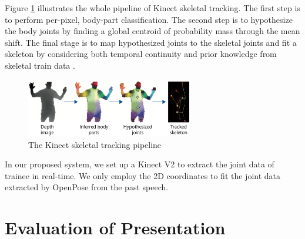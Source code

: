 
\par Figure \ref{fig:trackingpipeline} illustrates the whole pipeline of Kinect skeletal tracking. The first step is to perform per-pixel, body-part classification. The second step is to hypothesize the body joints by finding a global centroid of probability mass through the mean shift. The final stage is to map hypothesized joints to the skeletal joints and fit a skeleton by considering both temporal continuity and prior knowledge from skeletal train data \cite{Zhang2012}.

\begin{figure}[htbp]
  \centering\includegraphics[width=0.65\textwidth]{./img/skeletaltracking.png}
  \caption[The Kinect skeletal tracking pipeline]{The Kinect skeletal tracking pipeline \cite{Zhang2012}}\label{fig:trackingpipeline}
\end{figure}

\par In our proposed system, we set up a Kinect V2 to extract the joint data of trainee in real-time. We only employ the 2D coordinates to fit the joint data extracted by OpenPose from the past speech.

\section{Evaluation of Presentation}

